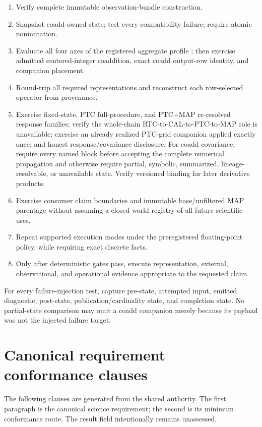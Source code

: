 \documentclass[10pt]{article}
\begin{document}
\begin{enumerate}
ALIGN-grid parent in the target WCS, one own-coordinate placement, separate
influence edges, and no precision or temporal-support promotion.
\item Verify complete immutable observation-bundle construction.
\item Snapshot coadd-owned state; test every compatibility failure; require
atomic nonmutation.
\item Evaluate all four axes of the registered aggregate profile
\SCIMapCoaddProfile; then exercise admitted
centered-integer coaddition, exact coadd output-row identity, and companion
placement.
\item Round-trip all required representations and reconstruct each
row-selected operator from provenance.
\item Exercise fixed-state, PTC full-procedure, and PTC+MAP re-resolved
response families; verify the whole-chain RTC-to-CAL-to-PTC-to-MAP role is
unavailable; exercise an already realized PTC-grid companion applied exactly
once; and honest response/covariance disclosure. For coadd covariance, require
every named block before accepting the complete numerical propagation and
otherwise require partial, symbolic, summarized, lineage-resolvable, or
unavailable state. Verify versioned binding for later derivative products.
\item Exercise consumer claim boundaries and immutable base/unfiltered MAP parentage without
assuming a closed-world registry of all future scientific uses.
\item Repeat supported execution modes under the preregistered floating-point
policy, while requiring exact discrete facts.
\item Only after deterministic gates pass, execute representation, external,
observational, and operational evidence appropriate to the requested claim.
\end{enumerate}

For every failure-injection test, capture pre-state, attempted input, emitted
diagnostic, post-state, publication/cardinality state, and completion state.
No partial-state comparison may omit a coadd companion merely because its
payload was not the injected failure target.

\clearpage
\section{Canonical requirement conformance clauses}\label{sec:requirements}

The following clauses are generated from the shared authority. The first
paragraph is the canonical science requirement; the second is its minimum
conformance route. The result field intentionally remains unassessed.
\end{document}
